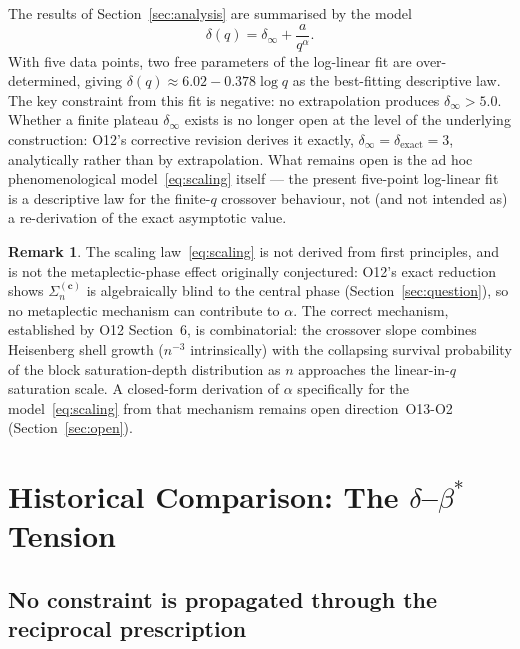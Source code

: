\documentclass[11pt,a4paper]{article}
\theoremstyle{plain}
\theoremstyle{definition}
\newtheorem{remark}[theorem]{Remark}
\newcommand{\bstar}{\beta^*}
\begin{document}
  The results of Section~\ref{sec:analysis} are summarised by the model
  \begin{equation}
    \delta(q) = \delta_\infty + \frac{a}{q^\alpha}.
    \label{eq:scaling}
  \end{equation}
  With five data points, two free parameters of the log-linear fit are
  over-determined, giving $\delta(q) \approx 6.02 - 0.378 \log q$ as the
  best-fitting descriptive law.
  The key constraint from this fit is negative: no extrapolation produces
  $\delta_\infty > 5.0$.
  Whether a finite plateau $\delta_\infty$ exists is no longer open at the level
  of the underlying construction: O12's corrective revision derives it exactly,
  $\delta_\infty = \delta_{\mathrm{exact}} = 3$, analytically rather than by
  extrapolation.
  What remains open is the ad hoc phenomenological model~\eqref{eq:scaling}
  itself — the present five-point log-linear fit is a descriptive law for the
  finite-$q$ crossover behaviour, not (and not intended as) a re-derivation of
  the exact asymptotic value.

  \begin{remark}
    The scaling law~\eqref{eq:scaling} is not derived from first principles, and
    is not the metaplectic-phase effect originally conjectured: O12's exact
    reduction shows $\Sigma_n^{(\mathbf{c})}$ is algebraically blind to the
    central phase (Section~\ref{sec:question}), so no metaplectic mechanism can
    contribute to $\alpha$.
    The correct mechanism, established by O12 Section~6, is combinatorial: the
    crossover slope combines Heisenberg shell growth ($n^{-3}$ intrinsically)
    with the collapsing survival probability of the block saturation-depth
    distribution as $n$ approaches the linear-in-$q$ saturation scale.
    A closed-form derivation of $\alpha$ specifically for the
    model~\eqref{eq:scaling} from that mechanism remains open direction~O13-O2
    (Section~\ref{sec:open}).
  \end{remark}

  \section{Historical Comparison: The
  \texorpdfstring{$\delta$--$\bstar$}{delta--beta*} Tension}
  \label{sec:tension}

  \subsection{No constraint is propagated through the reciprocal prescription}
\end{document}
